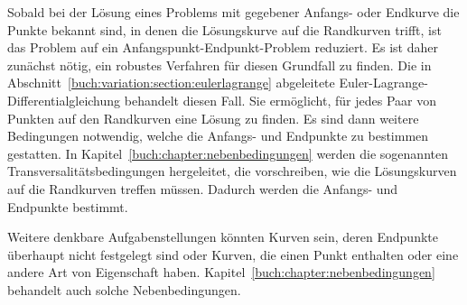 Sobald bei der Lösung eines Problems mit gegebener Anfangs- oder Endkurve
die Punkte bekannt sind, in denen die Lösungskurve auf die Randkurven
trifft, ist das Problem auf ein Anfangspunkt-Endpunkt-Problem reduziert.
Es ist daher zunächst nötig, ein robustes Verfahren für diesen Grundfall
zu finden.
Die in Abschnitt~\ref{buch:variation:section:eulerlagrange}
abgeleitete Euler-Lagrange-Differentialgleichung behandelt diesen
Fall.
Sie ermöglicht, für jedes Paar von Punkten auf den Randkurven
eine Lösung zu finden.
Es sind dann weitere Bedingungen notwendig, welche die Anfangs- und
Endpunkte zu bestimmen gestatten.
In Kapitel~\ref{buch:chapter:nebenbedingungen} werden die sogenannten
Transversalitätsbedingungen hergeleitet, die vorschreiben, wie die
Lösungskurven auf die Randkurven treffen müssen.
Dadurch werden die Anfangs- und Endpunkte bestimmt.

Weitere denkbare Aufgabenstellungen könnten Kurven sein, deren Endpunkte
überhaupt nicht festgelegt sind oder Kurven, die einen Punkt enthalten
oder eine andere Art von Eigenschaft haben.
Kapitel~\ref{buch:chapter:nebenbedingungen} behandelt auch solche
Nebenbedingungen.


